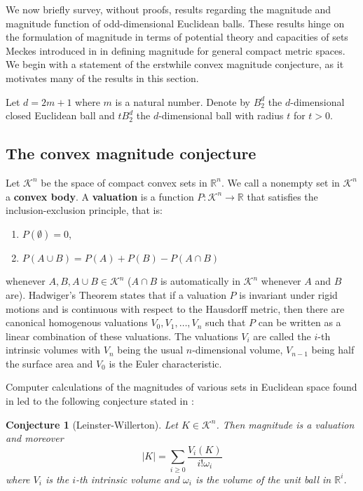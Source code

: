 \documentclass[11pt]{article}
\theoremstyle{mythm}
\newtheorem*{conj}{Conjecture}
\begin{document}
We now briefly survey, without proofs, results regarding the magnitude and magnitude function of odd-dimensional Euclidean balls. These results hinge on the formulation of magnitude in terms of potential theory and capacities of sets Meckes introduced in \cite{meckes_magnitude_2015} in defining magnitude for general compact metric spaces. We begin with a statement of the erstwhile convex magnitude conjecture, as it motivates many of the results in this section.

Let $d = 2m+1$ where $m$ is a natural number. Denote by $B_2^d$ the $d$-dimensional closed Euclidean ball and $tB_2^d$ the $d$-dimensional ball with radius $t$ for $t > 0$.

\subsection{The convex magnitude conjecture}

Let $\mathcal{K}^n$ be the space of compact convex sets in $\mathbb{R}^n$. We call a nonempty set in $\mathcal{K}^n$ a \textbf{convex body}. A \textbf{valuation} is a function $P:\mathcal{K}^n \to\mathbb{R}$ that satisfies the inclusion-exclusion principle, that is:
\begin{enumerate}[label=$\bullet$]
\item $P(\emptyset) = 0$,
\item $P(A\cup B) = P(A) + P(B) - P(A\cap B)$
\end{enumerate}
whenever $A,B,A\cup B \in \mathcal{K}^n$ ($A\cap B$ is automatically in $\mathcal{K}^n$ whenever $A$ and $B$ are). Hadwiger's Theorem states that if a valuation $P$ is invariant under rigid motions and is continuous with respect to the Hausdorff metric, then there are canonical homogenous valuations $V_0,V_1,\dots,V_n$ such that $P$ can be written as a linear combination of these valuations. The valuations $V_i$ are called the $i$-th intrinsic volumes with $V_n$ being the usual $n$-dimensional volume, $V_{n-1}$ being half the surface area and $V_0$ is the Euler characteristic.

Computer calculations of the magnitudes of various sets in Euclidean space found in \cite{willerton_heuristic_2009} led to the following conjecture stated in \cite{leinster_asymptotic_2013}:

\begin{conj}[Leinster-Willerton]
Let $K\in\mathcal{K}^n$. Then magnitude is a valuation and moreover
\begin{equation*}
\vert K \vert = \sum\limits_{i\geq0}\frac{V_i(K)}{i!\omega_i}
\end{equation*}
where $V_i$ is the $i$-th intrinsic volume and $\omega_i$ is the volume of the unit ball in $\mathbb{R}^i$.
\end{conj}
\end{document}
